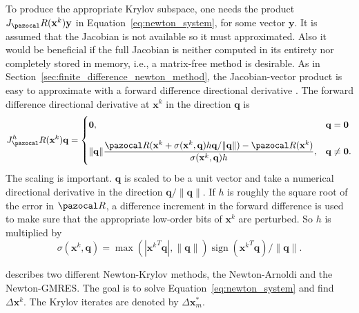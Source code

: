 To produce the appropriate Krylov subspace, one needs the product \(J_\pazocal R(\mathbf x^k) \mathbf y\) in Equation~\eqref{eq:newton_system}, for some vector \(\mathbf y\).
It is assumed that the Jacobian is not available so it must approximated.
Also it would be beneficial if the full Jacobian is neither computed in its entirety nor completely stored in memory, i.e., a matrix-free method is desirable.
As in Section~\ref{sec:finite_difference_newton_method}, the Jacobian-vector product is easy to approximate with a forward difference directional derivative \citep{kelley}. 
The forward difference directional derivative at \(\mathbf x^k\) in the direction \(\mathbf q\) is 
\begin{equation}
  J^h_\pazocal R(\mathbf x^k)\mathbf q =
\begin{cases}
  \mathbf 0, & \mathbf q = \mathbf 0 \\[10pt]
  \|\mathbf q\| \displaystyle\frac{\pazocal R(\mathbf x^k+\sigma(\mathbf x^k, \mathbf q) h \mathbf q /\|\mathbf q\|)-\pazocal R(\mathbf x^k)}{\sigma(\mathbf x^k, \mathbf q) h}, & \mathbf q \neq \mathbf 0 .
  \end{cases}
\end{equation}
The scaling is important. 
\(\mathbf q\) is scaled to be a unit vector and take a numerical directional derivative in the direction \(\mathbf q /\|\mathbf q\|\). 
If \(h\) is roughly the square root of the error in \(\pazocal R\), a difference increment in the forward difference is used to make sure that the appropriate low-order bits of \(\mathbf x^k\) are perturbed. 
So \(h\) is multiplied by
\begin{equation}
  \sigma(\mathbf x^k, \mathbf q)=\max (|{\mathbf x^k}^{T} \mathbf q|,\|\mathbf q\|) \operatorname{sign}({\mathbf x^k}^{T} \mathbf q) /\|\mathbf q\| .
\end{equation}

\cite{sidi_vector_2017} describes two different Newton-Krylov methods, the Newton-Arnoldi and the Newton-GMRES.
The goal is to solve Equation~\eqref{eq:newton_system} and find \(\Delta \mathbf x^k\).
The Krylov iterates are denoted by \(\Delta \mathbf x^*_m\).

